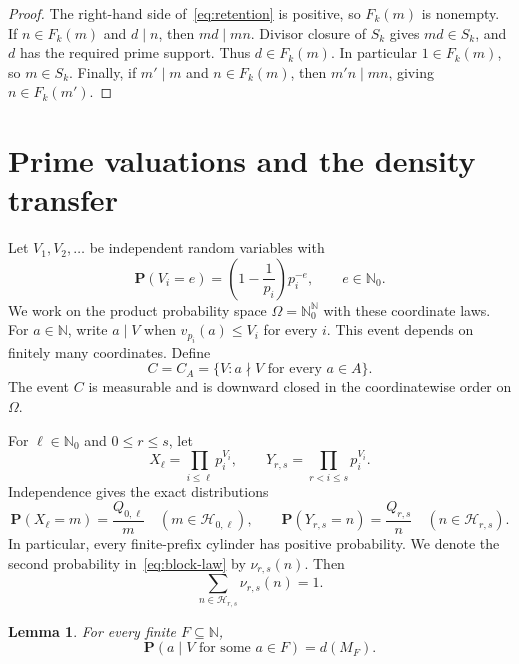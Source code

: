 \documentclass[11pt]{amsart}
\newtheorem{lemma}[theorem]{Lemma}
\theoremstyle{definition}
\numberwithin{equation}{section}
\newcommand{\N}{\mathbb N}
\newcommand{\Nzero}{\mathbb N_0}
\newcommand{\Prob}{\mathbf P}
\newcommand{\Hblock}[2]{\mathcal H_{#1,#2}}
\begin{document}
\begin{proof}
The right-hand side of~\eqref{eq:retention} is positive, so $F_k(m)$ is nonempty.
If $n\in F_k(m)$ and $d\mid n$, then $md\mid mn$.
Divisor closure of $S_k$ gives $md\in S_k$, and $d$ has the required prime support.
Thus $d\in F_k(m)$.
In particular $1\in F_k(m)$, so $m\in S_k$.
Finally, if $m'\mid m$ and $n\in F_k(m)$, then $m'n\mid mn$, giving $n\in F_k(m')$.
\end{proof}

\section{Prime valuations and the density transfer}

Let $V_1,V_2,\ldots$ be independent random variables with
\begin{equation}\label{eq:geometric}
  \Prob(V_i=e)=\left(1-\frac1{p_i}\right)p_i^{-e},
  \qquad e\in\Nzero.
\end{equation}
We work on the product probability space $\Omega=\Nzero^{\N}$ with these coordinate laws.
For $a\in\N$, write $a\mid V$ when $v_{p_i}(a)\leq V_i$ for every $i$.
This event depends on finitely many coordinates.
Define
\begin{equation}\label{eq:avoidance}
  C=C_A=\{V: a\nmid V\text{ for every }a\in A\}.
\end{equation}
The event $C$ is measurable and is downward closed in the coordinatewise order on $\Omega$.

For $\ell\in\Nzero$ and $0\leq r\leq s$, let
\[
  X_\ell=\prod_{i\leq\ell}p_i^{V_i},
  \qquad
  Y_{r,s}=\prod_{r<i\leq s}p_i^{V_i}.
\]
Independence gives the exact distributions
\begin{equation}\label{eq:block-law}
  \Prob(X_\ell=m)=\frac{Q_{0,\ell}}{m}\quad(m\in\Hblock{0}{\ell}),
  \qquad
  \Prob(Y_{r,s}=n)=\frac{Q_{r,s}}{n}\quad(n\in\Hblock{r}{s}).
\end{equation}
In particular, every finite-prefix cylinder has positive probability.
We denote the second probability in~\eqref{eq:block-law} by $\nu_{r,s}(n)$.
Then
\begin{equation}\label{eq:block-total}
  \sum_{n\in\Hblock{r}{s}}\nu_{r,s}(n)=1.
\end{equation}

\begin{lemma}\label{lem:finite-density}
For every finite $F\subseteq\N$,
\begin{equation}\label{eq:finite-density}
  \Prob(a\mid V\text{ for some }a\in F)=d(M_F).
\end{equation}
\end{lemma}
\end{document}
